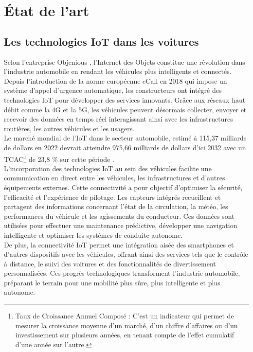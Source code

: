 \section{État de l'art}


\subsection{Les technologies IoT dans les voitures}

Selon l’entreprise Objenious \cite{noauthor_revolution_2025}, l’Internet des Objets constitue une révolution dans l’industrie automobile en rendant les véhicules plus intelligents et connectés. Depuis l’introduction de la norme européenne eCall en 2018 qui impose un système d’appel d’urgence automatique, les constructeurs ont intégré des technologies IoT pour développer des services innovants. Grâce aux réseaux haut débit comme la 4G et la 5G, les véhicules peuvent désormais collecter, envoyer et recevoir des données en temps réel interagissant ainsi avec les infrastructures routières, les autres véhicules et les usagers.\\
Le marché mondial de l’IoT dans le secteur automobile, estimé à 115,37 milliards de dollars en 2022 devrait atteindre 975,66 milliards de dollars d’ici 2032 avec un TCAC\footnote{Taux de Croissance Annuel Composé : C’est un indicateur qui permet de mesurer la croissance moyenne d’un marché, d’un chiffre d’affaires ou d’un investissement sur plusieurs années, en tenant compte de l’effet cumulatif d’une année sur l’autre.} de 23,8 \% sur cette période \cite{noauthor_taille_2023}.\\
L'incorporation des technologies IoT au sein des véhicules facilite une communication en direct entre les véhicules, les infrastructures et d'autres équipements externes. Cette connectivité a pour objectif d'optimiser la sécurité, l'efficacité et l'expérience de pilotage. Les capteurs intégrés recueillent et partagent des informations concernant l'état de la circulation, la météo, les performances du véhicule et les agissements du conducteur. Ces données sont utilisées pour effectuer une maintenance prédictive, développer une navigation intelligente et optimiser les systèmes de conduite autonome.\\
De plus, la connectivité IoT permet une intégration aisée des smartphones et d'autres dispositifs avec les véhicules, offrant ainsi des services tels que le contrôle à distance, le suivi des voitures et des fonctionnalités de divertissement personnalisées. Ces progrès technologiques transforment l'industrie automobile, préparant le terrain pour une mobilité plus sûre, plus intelligente et plus autonome.

